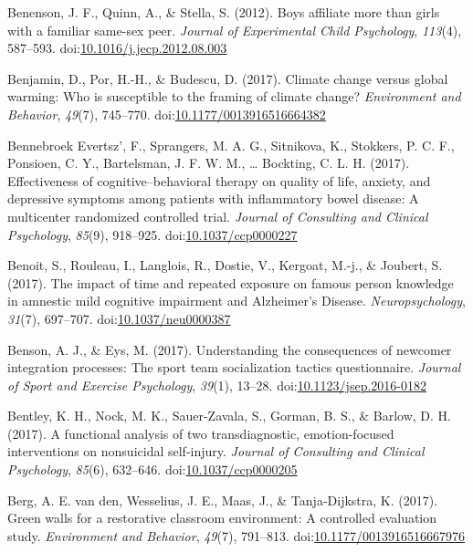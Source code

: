 \documentclass[english,man]{apa6}
\theoremstyle{definition}
\theoremstyle{definition}
\theoremstyle{definition}
\theoremstyle{remark}
\begin{document}
\hypertarget{ref-Benenson2012}{}
Benenson, J. F., Quinn, A., \& Stella, S. (2012). Boys affiliate more
than girls with a familiar same-sex peer. \emph{Journal of Experimental
Child Psychology}, \emph{113}(4), 587--593.
doi:\href{https://doi.org/10.1016/j.jecp.2012.08.003}{10.1016/j.jecp.2012.08.003}

\hypertarget{ref-Benjamin2017}{}
Benjamin, D., Por, H.-H., \& Budescu, D. (2017). Climate change versus
global warming: Who is susceptible to the framing of climate change?
\emph{Environment and Behavior}, \emph{49}(7), 745--770.
doi:\href{https://doi.org/10.1177/0013916516664382}{10.1177/0013916516664382}

\hypertarget{ref-BennebroekEvertsz2017a}{}
Bennebroek Evertsz', F., Sprangers, M. A. G., Sitnikova, K., Stokkers,
P. C. F., Ponsioen, C. Y., Bartelsman, J. F. W. M., \ldots{} Bockting,
C. L. H. (2017). Effectiveness of cognitive--behavioral therapy on
quality of life, anxiety, and depressive symptoms among patients with
inflammatory bowel disease: A multicenter randomized controlled trial.
\emph{Journal of Consulting and Clinical Psychology}, \emph{85}(9),
918--925.
doi:\href{https://doi.org/10.1037/ccp0000227}{10.1037/ccp0000227}

\hypertarget{ref-Benoit2017}{}
Benoit, S., Rouleau, I., Langlois, R., Dostie, V., Kergoat, M.-j., \&
Joubert, S. (2017). The impact of time and repeated exposure on famous
person knowledge in amnestic mild cognitive impairment and Alzheimer's
Disease. \emph{Neuropsychology}, \emph{31}(7), 697--707.
doi:\href{https://doi.org/10.1037/neu0000387}{10.1037/neu0000387}

\hypertarget{ref-Benson2017}{}
Benson, A. J., \& Eys, M. (2017). Understanding the consequences of
newcomer integration processes: The sport team socialization tactics
questionnaire. \emph{Journal of Sport and Exercise Psychology},
\emph{39}(1), 13--28.
doi:\href{https://doi.org/10.1123/jsep.2016-0182}{10.1123/jsep.2016-0182}

\hypertarget{ref-Bentley2017}{}
Bentley, K. H., Nock, M. K., Sauer-Zavala, S., Gorman, B. S., \& Barlow,
D. H. (2017). A functional analysis of two transdiagnostic,
emotion-focused interventions on nonsuicidal self-injury. \emph{Journal
of Consulting and Clinical Psychology}, \emph{85}(6), 632--646.
doi:\href{https://doi.org/10.1037/ccp0000205}{10.1037/ccp0000205}

\hypertarget{ref-VandenBerg2017}{}
Berg, A. E. van den, Wesselius, J. E., Maas, J., \& Tanja-Dijkstra, K.
(2017). Green walls for a restorative classroom environment: A
controlled evaluation study. \emph{Environment and Behavior},
\emph{49}(7), 791--813.
doi:\href{https://doi.org/10.1177/0013916516667976}{10.1177/0013916516667976}
\end{document}

